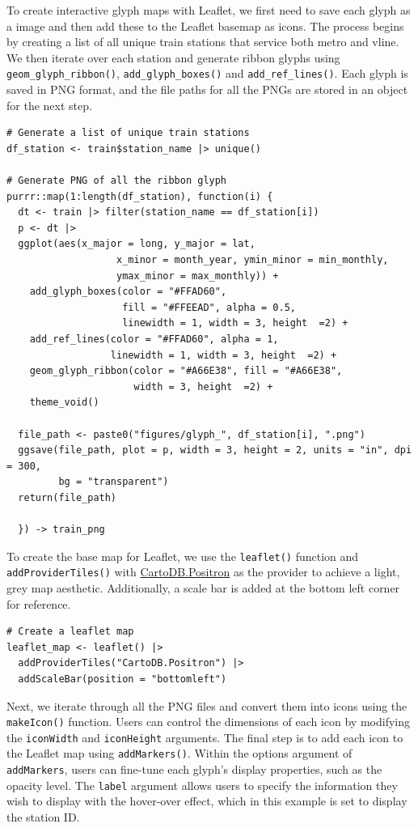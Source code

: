 To create interactive glyph maps with Leaflet, we first need to save each glyph as a image and then add these to the Leaflet basemap as icons. The process begins by creating a list of all unique train stations that service both metro and vline. We then iterate over each station and generate ribbon glyphs using \texttt{geom\_glyph\_ribbon()}, \texttt{add\_glyph\_boxes()} and \texttt{add\_ref\_lines()}. Each glyph is saved in PNG format, and the file paths for all the PNGs are stored in an object for the next step.

\begin{verbatim}
# Generate a list of unique train stations
df_station <- train$station_name |> unique()

# Generate PNG of all the ribbon glyph
purrr::map(1:length(df_station), function(i) {
  dt <- train |> filter(station_name == df_station[i])
  p <- dt |>
  ggplot(aes(x_major = long, y_major = lat,
                   x_minor = month_year, ymin_minor = min_monthly,
                   ymax_minor = max_monthly)) +
    add_glyph_boxes(color = "#FFAD60", 
                    fill = "#FFEEAD", alpha = 0.5,
                    linewidth = 1, width = 3, height  =2) +
    add_ref_lines(color = "#FFAD60", alpha = 1,
                  linewidth = 1, width = 3, height  =2) +
    geom_glyph_ribbon(color = "#A66E38", fill = "#A66E38",
                      width = 3, height  =2) +
    theme_void() 
  
  file_path <- paste0("figures/glyph_", df_station[i], ".png")
  ggsave(file_path, plot = p, width = 3, height = 2, units = "in", dpi = 300,
         bg = "transparent")
  return(file_path)

  }) -> train_png 
\end{verbatim}

To create the base map for Leaflet, we use the \texttt{leaflet()} function and \texttt{addProviderTiles()} with \href{https://github.com/CartoDB/basemap-styles}{CartoDB.Positron} as the provider to achieve a light, grey map aesthetic. Additionally, a scale bar is added at the bottom left corner for reference.

\begin{verbatim}
# Create a leaflet map 
leaflet_map <- leaflet() |>
  addProviderTiles("CartoDB.Positron") |>
  addScaleBar(position = "bottomleft")
\end{verbatim}

Next, we iterate through all the PNG files and convert them into icons using the \texttt{makeIcon()} function. Users can control the dimensions of each icon by modifying the \texttt{iconWidth} and \texttt{iconHeight} arguments. The final step is to add each icon to the Leaflet map using \texttt{addMarkers()}. Within the options argument of \texttt{addMarkers}, users can fine-tune each glyph's display properties, such as the opacity level. The \texttt{label} argument allows users to specify the information they wish to display with the hover-over effect, which in this example is set to display the station ID.

